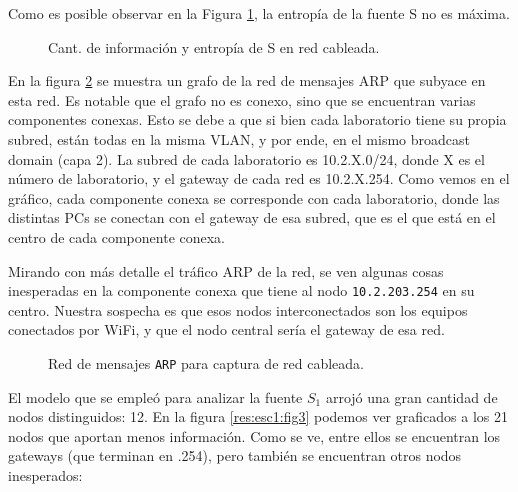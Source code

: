 Como es posible observar en la Figura \ref{res:esc1:fig1}, la entropía de la fuente S no es máxima. 


\begin{figure}[h]
	\caption{Cant. de información y entropía de S en red cableada.}
    \label{res:esc1:fig1}
\end{figure}

En la figura \ref{res:esc1:fig2} se muestra un grafo de la red de mensajes ARP que subyace en esta red. Es notable que el grafo no es conexo, sino que se encuentran varias componentes conexas. Esto se debe a que si bien cada laboratorio tiene su propia subred, están todas en la misma VLAN, y por ende, en el mismo broadcast domain (capa 2). La subred de cada laboratorio es 10.2.X.0/24, donde X es el número de laboratorio, y el gateway de cada red es 10.2.X.254. Como vemos en el gráfico, cada componente conexa se corresponde con cada laboratorio, donde las distintas PCs se conectan con el gateway de esa subred, que es el que está en el centro de cada componente conexa.

Mirando con más detalle el tráfico ARP de la red, se ven algunas cosas inesperadas en la componente conexa que tiene al nodo \texttt{10.2.203.254} en su centro. Nuestra sospecha es que esos nodos interconectados son los equipos conectados por WiFi, y que el nodo central sería el gateway de esa red.




\begin{figure}[H]
    \caption{Red de mensajes \texttt{ARP} para captura de red cableada.}
    \label{res:esc1:fig2}
\end{figure}



El modelo que se empleó para analizar la fuente $S_1$ arrojó una gran cantidad de nodos distinguidos: 12. En la figura \ref{res:esc1:fig3} podemos ver graficados a los 21 nodos que aportan menos información. Como se ve, entre ellos se encuentran los gateways (que terminan en .254), pero también se encuentran otros nodos inesperados:

